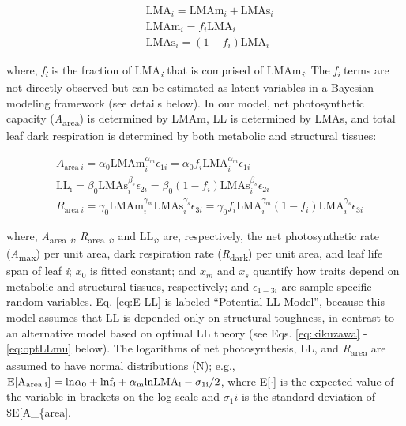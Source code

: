 \documentclass[12pt,]{article}
\theoremstyle{definition}
\theoremstyle{definition}
\theoremstyle{definition}
\theoremstyle{remark}
\begin{document}
\begin{align}
  &\mathrm{LMA}_{i} =\mathrm{LMAm}_{i} + \mathrm{LMAs}_{i} \label{eq:LMA}\\
  &\mathrm{LMAm}_{i} = f_{i} \mathrm{LMA}_{i} \label{eq:LMAm}\\
  &\mathrm{LMAs}_{i} = (1 - f_{i})  \mathrm{LMA}_{i}\label{eq:LMAs}
\end{align}

where, \emph{f\textsubscript{i}} is the fraction of
LMA\textsubscript{\emph{i}} that is comprised of
LMAm\textsubscript{\emph{i}}. The \emph{f\textsubscript{i}} terms are
not directly observed but can be estimated as latent variables in a
Bayesian modeling framework (see details below). In our model, net
photosynthetic capacity (\emph{A}\textsubscript{area}) is determined by
LMAm, LL is determined by LMAs, and total leaf dark respiration is
determined by both metabolic and structural tissues:

\begin{align}
& A_{\mathrm{area} \; i}
= \alpha_0\mathrm{LMAm}_{i}^{\alpha_m} \epsilon_{1i} =  \alpha_0 f_i \mathrm{LMA}_{i}^{\alpha_m} \epsilon_{1i} \\
& \mathrm{LL_i} = \beta_0\mathrm{LMAs}_{i}^{\beta_s} \epsilon_{2i}  = \beta_0 (1 - f_i)\mathrm{LMAs}_{i}^{\beta_s} \epsilon_{2i}\\
& R_{\mathrm{area} \; i}
= \gamma_0\mathrm{LMAm}_{i}^{\gamma_m} \mathrm{LMAs}_{i}^{\gamma_s} \epsilon_{3i}
= \gamma_0 f_i \mathrm{LMA}_{i}^{\gamma_m}  (1-f_i)\mathrm{LMA}_{i}^{\gamma_s} \epsilon_{3i}
\end{align}

where, \emph{A}\textsubscript{area} \textsubscript{\emph{i}},
\emph{R}\textsubscript{area} \textsubscript{\emph{i}}, and
LL\textsubscript{\emph{i}}, are, respectively, the net photosynthetic
rate (\emph{A}\textsubscript{max}) per unit area, dark respiration rate
(\emph{R}\textsubscript{dark}) per unit area, and leaf life span of leaf
\emph{i}; \(x_0\) is fitted constant; and \(x_m\) and \(x_s\) quantify
how traits depend on metabolic and structural tissues, respectively; and
\(\epsilon_{1-3i}\) are sample specific random variables. Eq.
\eqref{eq:E-LL} is labeled ``Potential LL Model'', because this model
assumes that LL is depended only on structural toughness, in contrast to
an alternative model based on optimal LL theory (see Eqs.
\eqref{eq:kikuzawa} - \eqref{eq:optLLmu} below). The logarithms of net
photosynthesis, LL, and \emph{R}\textsubscript{area} are assumed to have
normal distributions (N); e.g.,
\(\rm{E}[A_{\mathrm{area} \; i}] = \mathrm{ln}\alpha_0 + \mathrm{ln}f_i + \alpha_m \mathrm{lnLMA}_i -\sigma_{1i}/2\),
where E{[}\(\cdot\){]} is the expected value of the variable in brackets
on the log-scale and \(\sigma_1i\) is the standard deviation of
\$\rm{E}[A\_\{\rm{area}].
\end{document}
